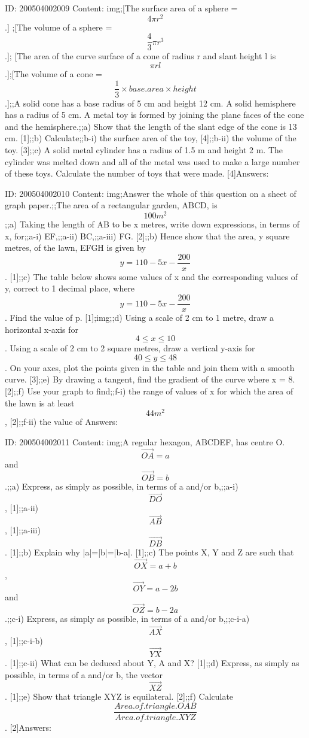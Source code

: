 \documentclass{article}
\begin{document}
ID: 200504002009
Content:
img;[The surface area of a sphere = $$4 \pi r^{2} $$.] ;[The volume of a sphere = $$\frac{4}{3} \pi r^{3} $$.]; [The area of the curve surface of a cone of radius r and slant height l is $$\pi rl$$.];[The volume of a cone = $$\frac{1}{3} \times  base.area \times height$$.];;A solid cone has a base radius of 5 cm and height 12 cm. A solid hemisphere has a radius of 5 cm. A metal toy is formed by joining the plane faces of the cone and the hemisphere.;;a) Show that the length of the slant edge of the cone is 13 cm. [1];;b) Calculate;;b-i) the surface area of the toy, [4];;b-ii) the volume of the toy. [3];;c) A solid metal cylinder has a radius of 1.5 m and height 2 m. The cylinder was melted down and all of the metal was used to make a large number of these toys. Calculate the number of toys that were made. [4]Answers:

ID: 200504002010
Content:
img;Answer the whole of this question on a sheet of graph paper.;;The area of a rectangular garden, ABCD, is $$100 m^2$$;;a) Taking the length of AB to be x metres, write down expressions, in terms of x, for;;a-i) EF,;;a-ii) BC,;;a-iii) FG. [2];;b) Hence show that the area, y square metres, of the lawn, EFGH is given by $$y=110-5x-\frac{200}{x}$$. [1];;c) The table below shows some values of x and the corresponding values of y, correct to 1 decimal place, where $$y=110-5x-\frac{200}{x}$$. Find the value of p. [1];img;;d) Using a scale of 2 cm to 1 metre, draw a horizontal x-axis for $$4\leq x\leq 10$$. Using a scale of 2 cm to 2 square metres, draw a vertical y-axis for $$40\leq y\leq 48$$. On your axes, plot the points given in the table and join them with a smooth curve. [3];;e) By drawing a tangent, find the gradient of the curve where x = 8. [2];;f) Use your graph to find;;f-i) the range of values of x for which the area of the lawn is at least $$44 m^{2} $$, [2];;f-ii) the value of Answers:

ID: 200504002011
Content:
img;A regular hexagon, ABCDEF, has centre O. $$\vec{OA}=a$$ and $$\vec{OB}=b$$.;;a) Express, as simply as possible, in terms of a and/or b,;;a-i) $$\vec{DO}$$, [1];;a-ii) $$\vec{AB}$$, [1];;a-iii) $$\vec{DB}$$. [1];;b) Explain why |a|=|b|=|b-a|. [1];;c) The points X, Y and Z are such that $$\vec{OX}=a+b$$, $$\vec{OY}=a-2b$$ and $$\vec{OZ}=b-2a$$.;;c-i) Express, as simply as possible, in terms of a and/or b,;;c-i-a) $$\vec{AX}$$, [1];;c-i-b) $$\vec{YX}$$. [1];;c-ii) What can be deduced about Y, A and X? [1];;d) Express, as simply as possible, in terms of a and/or b, the vector $$\vec{XZ}$$. [1];;e) Show that triangle XYZ is equilateral. [2];;f) Calculate $$\frac{Area.of.triangle.OAB}{Area.of.triangle.XYZ}$$ . [2]Answers:
\end{document}
